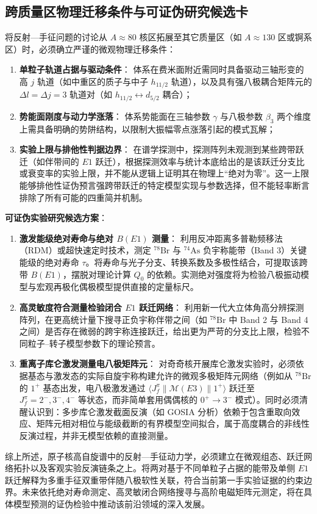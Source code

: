 \subsection{跨质量区物理迁移条件与可证伪研究候选卡}\label{sec:4-5-6}

将反射---手征问题的讨论从 $A \approx 80$ 核区拓展至其它质量区（如 $A \approx 130$ 区或锕系区）时，必须确立严谨的微观物理迁移条件：
\begin{enumerate}
\item \textbf{单粒子轨道占据与驱动条件}：
体系在费米面附近需同时具备驱动三轴形变的高 $j$ 轨道（如中重区的质子与中子 $h_{11/2}$ 轨道），以及具有强八极耦合矩阵元的 $\Delta l = \Delta j = 3$ 轨道对（如 $h_{11/2} \leftrightarrow d_{5/2}$ 耦合）；
\item \textbf{势能面刚度与动力学涨落}：
体系势能面在三轴参数 $\gamma$ 与八极参数 $\beta_3$ 两个维度上需具备明确的势阱结构，以限制大振幅零点涨落引起的模式瓦解；
\item \textbf{实验上限与排他性判据边界}：
在谱学探测中，探测阵列未观测到某些跨带跃迁（如伴带间的 $E1$ 跃迁），根据探测效率与统计本底给出的是该跃迁分支比或衰变率的实验上限，并不能从逻辑上证明其在物理上“绝对为零”。这一上限能够排他性证伪预言强跨带跃迁的特定模型实现与参数选择，但不能轻率断言排除了所有可能的四重简并机制。
\end{enumerate}

\textbf{可证伪实验研究候选方案}：
\begin{enumerate}
\item \textbf{激发能级绝对寿命与绝对 $B(E1)$ 测量}：
利用反冲距离多普勒频移法（RDM）或超快速定时技术，测定 $^{78}\mathrm{Br}$ 与 $^{74}\mathrm{As}$ 负宇称能带（Band 3）关键能级的绝对寿命 $\tau$。将寿命与光子分支、转换系数及多极性结合，可提取该跨带 $B(E1)$，摆脱对理论计算 $Q_0$ 的依赖。实测绝对强度将为检验八极振动模型与宏观再极化偶极模型提供直接的定量标尺。
\item \textbf{高灵敏度符合测量检验闭合 $E1$ 跃迁网络}：
利用新一代大立体角高分辨探测阵列，在更高统计量下搜寻正负宇称伴带之间（如 $^{78}\mathrm{Br}$ 中 Band 2 与 Band 4 之间）是否存在微弱的跨宇称连接跃迁，给出更为严苛的分支比上限，检验不同粒子--转子模型参数下的理论预言。
\item \textbf{重离子库仑激发测量电八极矩阵元}：
对奇奇核开展库仑激发实验时，必须依据基态与激发态的实际自旋宇称构建允许的微观多极矩阵元网络（例如从 $^{78}\mathrm{Br}$ 的 $1^+$ 基态出发，电八极激发通过 $\langle J_f^\pi \| \mathcal{M}(E3) \| 1^+ \rangle$ 跃迁至 $J_f^\pi = 2^-, 3^-, 4^-$ 等状态，而非简单套用偶偶核的 $0^+ \to 3^-$ 模式）。同时必须清醒认识到：多步库仑激发截面反演（如 GOSIA 分析）依赖于包含重取向效应、矩阵元相对相位与能级截断的有界模型空间拟合，属于高度耦合的非线性反演过程，并非无模型依赖的直接测量。
\end{enumerate}

综上所述，原子核高自旋谱中的反射---手征动力学，必须建立在微观组态、跃迁网络拓扑以及客观实验反演链条之上。将两对基于不同单粒子占据的能带及单侧 $E1$ 跃迁解释为多重手征双重带伴随八极软性关联，符合当前第一手实验证据的约束边界。未来依托绝对寿命测定、高灵敏闭合网络搜寻与高阶电磁矩阵元测定，将在具体模型预测的证伪检验中推动该前沿领域的深入发展。

